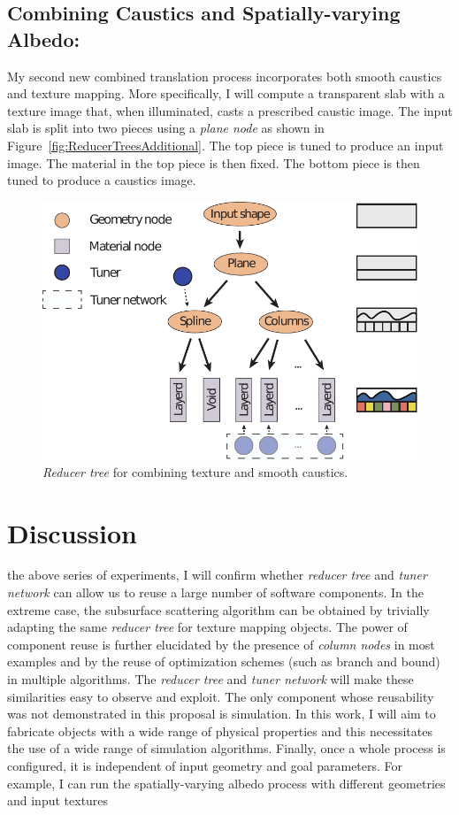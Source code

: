 \section{Combining Caustics and Spatially-varying Albedo:}
My second new combined translation process incorporates both smooth caustics and texture mapping.
More specifically, I will compute a transparent slab with a texture image that, when illuminated, casts a prescribed caustic image.
The input slab is split into two pieces using a \emph{plane node} as shown in Figure~\ref{fig:ReducerTreesAdditional}.
The top piece is tuned to produce an input image. The material in the top piece is then fixed. The bottom piece is then tuned to produce a caustics image.
\begin{figure}
\centering
\includegraphics[scale=0.7]{figure/treeTexSpline.pdf}
\caption {\emph{Reducer tree} for combining texture and smooth caustics.
}
\label{fig:treeDeform}
\end{figure}

\chapter{Discussion}
 the above series of experiments, I will confirm whether \emph{reducer tree} and \emph{tuner network} can allow us to reuse a large number of software components.
In the extreme case, the subsurface scattering algorithm can be obtained by trivially adapting the same \emph{reducer tree} for texture mapping objects.
The power of component reuse is further elucidated by the presence of \emph{column nodes} in most examples and by the reuse of optimization schemes (such as branch and bound) in multiple algorithms.
The \emph{reducer tree} and \emph{tuner network} will make these similarities easy to observe and exploit.
The only component whose reusability was not demonstrated in this proposal is simulation.
In this work, I will aim to fabricate objects with a wide range of physical properties and this necessitates the use of a wide range of simulation algorithms. Finally, once a whole process is configured, it is independent of input geometry and goal parameters. For example, I can run the spatially-varying albedo process with different geometries and input textures

